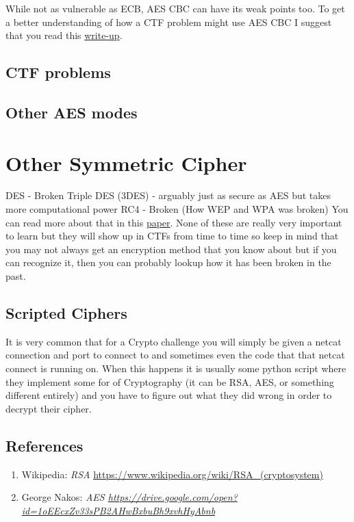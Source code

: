\documentclass{report}
\begin{document}
While not as vulnerable as ECB, AES CBC can have its weak points too.  To get a better understanding of how a CTF problem might use AES CBC I suggest that you read this \href{https://github.com/RandomsCTF/write-ups/tree/master/Defcamp\%20CTF\%20Qualification\%202015/No\%20Crypto\%20\%5Bcrypto\%5D\%20(200)}{write-up}.

\section{CTF problems}

\section{Other AES modes}

\chapter{Other Symmetric Cipher}
DES - Broken \newline
Triple DES (3DES) - arguably just as secure as AES but takes more computational power \newline
RC4 - Broken (How WEP and WPA was broken) You can read more about that in this \href{http://cr.yp.to/streamciphers/rc4biases-20130708.pdf}{paper}.
\newline \newline
None of these are really very important to learn but they will show up in CTFs from time to time so keep in mind that you may not always get an encryption method that you know about but if you can recognize it, then you can probably lookup how it has been broken in the past.

\section{Scripted Ciphers}
It is very common that for a Crypto challenge you will simply be given a netcat connection and port to connect to and sometimes even the code that that netcat connect is running on.  When this happens it is usually some python script where they implement some for of Cryptography (it can be RSA, AES, or something different entirely) and you have to figure out what they did wrong in order to decrypt their cipher.  




\vspace{1cm}
\section{References}
\label{ref:6}
\begin{enumerate}[label=(\alph*)]
\item Wikipedia: \textit{RSA} \url{https://www.wikipedia.org/wiki/RSA_(cryptosystem)}
\item George Nakos: \textit{AES \url{https://drive.google.com/open?id=1oEEcxZv33sPB2AHwBxbuBh9xvhHyAbnb}}
\end{enumerate}
\end{document}
